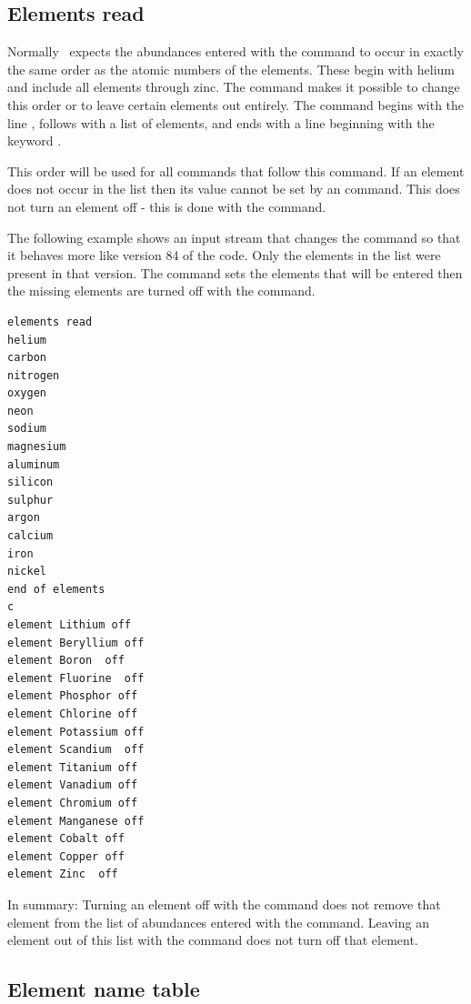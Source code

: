 \subsection{Elements read}

Normally \Cloudy\ expects the abundances entered with the
 command
to occur in exactly the same order as the atomic numbers of the elements.
These begin with helium and include all elements through zinc.
The  command makes it possible
to change this order or to leave certain
elements out entirely.
The command begins with the line ,
follows with a list of elements, and ends with a line beginning with the
keyword .

This order will be used for all  commands
that follow this command.
If an element does not occur in the list then its value cannot
be set by an  command.
This does not turn an element off - this
is done with the  command.

The following example shows an input stream that changes the
command so that it behaves more like version 84 of the code.
Only the
elements in the list were present in that version.
The  command
sets the elements that will be entered then the missing elements are turned
off with the  command.
\begin{verbatim}
elements read
helium
carbon
nitrogen
oxygen
neon
sodium
magnesium
aluminum
silicon
sulphur
argon
calcium
iron
nickel
end of elements
c
element Lithium off
element Beryllium off
element Boron  off
element Fluorine  off
element Phosphor off
element Chlorine off
element Potassium off
element Scandium  off
element Titanium off
element Vanadium off
element Chromium off
element Manganese off
element Cobalt off
element Copper off
element Zinc  off
\end{verbatim}

In summary:  Turning an element off with the
 command does
not remove that element from the list of abundances entered with the
 command.
Leaving an element out of this list with the
 command does not turn off that element.

\subsection{Element name table}

